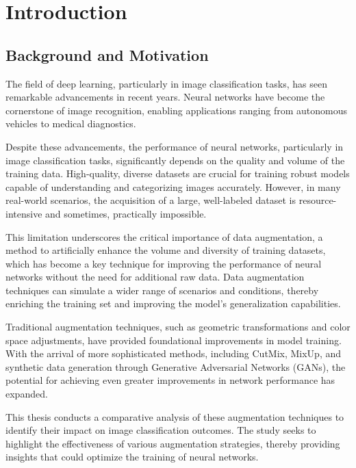 \chapter{Introduction}
\label{cha:Introduction}


\section{Background and Motivation}
\label{sec:background}

The field of deep learning, particularly in image classification tasks, has seen remarkable advancements in recent years. Neural networks have become the cornerstone of image recognition, enabling applications ranging from autonomous vehicles to medical diagnostics.

Despite these advancements, the performance of neural networks, particularly in image classification tasks, significantly depends on the quality and volume of the training data. High-quality, diverse datasets are crucial for training robust models capable of understanding and categorizing images accurately. However, in many real-world scenarios, the acquisition of a large, well-labeled dataset is resource-intensive and sometimes, practically impossible. 

This limitation underscores the critical importance of data augmentation, a method to artificially enhance the volume and diversity of training datasets, which has become a key technique for improving the performance of neural networks without the need for additional raw data. Data augmentation techniques can simulate a wider range of scenarios and conditions, thereby enriching the training set and improving the model's generalization capabilities.

Traditional augmentation techniques, such as geometric transformations and color space adjustments, have provided foundational improvements in model training. With the arrival of more sophisticated methods, including CutMix, MixUp, and synthetic data generation through Generative Adversarial Networks (GANs), the potential for achieving even greater improvements in network performance has expanded. 

This thesis conducts a comparative analysis of these augmentation techniques to identify their impact on image classification outcomes. The study seeks to highlight the effectiveness of various augmentation strategies, thereby providing insights that could optimize the training of neural networks.

